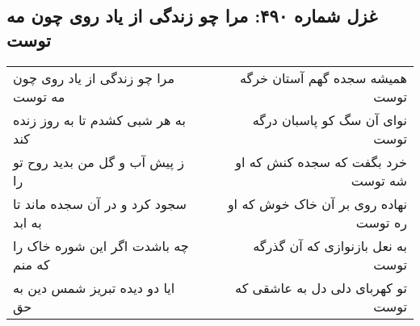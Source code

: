 \begin{center}
\section*{غزل شماره ۴۹۰: مرا چو زندگی از یاد روی چون مه توست}
\label{sec:0490}
\begin{longtable}{l p{0.5cm} r}
مرا چو زندگی از یاد روی چون مه توست
&&
همیشه سجده گهم آستان خرگه توست
\\
به هر شبی کشدم تا به روز زنده کند
&&
نوای آن سگ کو پاسبان درگه توست
\\
ز پیش آب و گل من بدید روح تو را
&&
خرد بگفت که سجده کنش که او شه توست
\\
سجود کرد و در آن سجده ماند تا به ابد
&&
نهاده روی بر آن خاک خوش که او ره توست
\\
چه باشدت اگر این شوره خاک را که منم
&&
به نعل بازنوازی که آن گذرگه توست
\\
ایا دو دیده تبریز شمس دین به حق
&&
تو کهربای دلی دل به عاشقی که توست
\\
\end{longtable}
\end{center}
